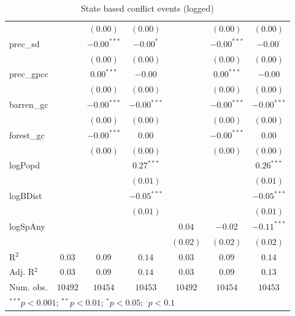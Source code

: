 \begin{sidewaystable}
\begin{center}
{\begin{tabular}{l c c c c c c}
                &               & $(0.00)$      & $(0.00)$      &               & $(0.00)$      & $(0.00)$        \\
prec\_sd        &               & $-0.00^{***}$ & $-0.00^{*}$   &               & $-0.00^{***}$ & $-0.00^{\cdot}$ \\
                &               & $(0.00)$      & $(0.00)$      &               & $(0.00)$      & $(0.00)$        \\
prec\_gpcc      &               & $0.00^{***}$  & $-0.00$       &               & $0.00^{***}$  & $-0.00$         \\
                &               & $(0.00)$      & $(0.00)$      &               & $(0.00)$      & $(0.00)$        \\
barren\_gc      &               & $-0.00^{***}$ & $-0.00^{***}$ &               & $-0.00^{***}$ & $-0.00^{***}$   \\
                &               & $(0.00)$      & $(0.00)$      &               & $(0.00)$      & $(0.00)$        \\
forest\_gc      &               & $-0.00^{***}$ & $0.00$        &               & $-0.00^{***}$ & $0.00$          \\
                &               & $(0.00)$      & $(0.00)$      &               & $(0.00)$      & $(0.00)$        \\
logPopd         &               &               & $0.27^{***}$  &               &               & $0.26^{***}$    \\
                &               &               & $(0.01)$      &               &               & $(0.01)$        \\
logBDist        &               &               & $-0.05^{***}$ &               &               & $-0.05^{***}$   \\
                &               &               & $(0.01)$      &               &               & $(0.01)$        \\
logSpAny        &               &               &               & $0.04$        & $-0.02$       & $-0.11^{***}$   \\
                &               &               &               & $(0.02)$      & $(0.02)$      & $(0.02)$        \\
\hline
R$^2$           & $0.03$        & $0.09$        & $0.14$        & $0.03$        & $0.09$        & $0.14$          \\
Adj. R$^2$      & $0.03$        & $0.09$        & $0.14$        & $0.03$        & $0.09$        & $0.13$          \\
Num. obs.       & $10492$       & $10454$       & $10453$       & $10492$       & $10454$       & $10453$         \\
\hline
\multicolumn{7}{l}{\scriptsize{$^{***}p<0.001$; $^{**}p<0.01$; $^{*}p<0.05$; $^{\cdot}p<0.1$}}
\end{tabular}
}
\caption{State based conflict events (logged)}
\label{logState_based}
\end{center}
\end{sidewaystable}
